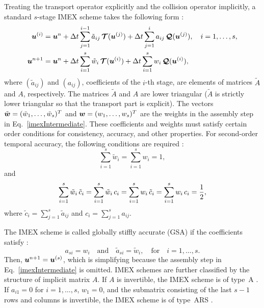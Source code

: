 Treating the transport operator explicitly and the collision operator implicitly, a standard $s$-stage IMEX scheme takes the following form \cite{pareschiRusso_2005}: 
\begin{align}
  \boldsymbol{u}^{(i)}
  &=\boldsymbol{u}^{n}
  +\Delta t\sum_{j=1}^{i-1}\tilde{a}_{ij}\,\boldsymbol{\mathcal{T}}(\boldsymbol{u}^{(j)})
  +\Delta t\sum_{j=1}^{i}a_{ij}\,\boldsymbol{\mathcal{Q}}(\boldsymbol{u}^{(j)}),
  \quad i=1,\ldots,s, \label{imexStages} \\
  \boldsymbol{u}^{n+1}
  &=\boldsymbol{u}^{n}
  +\Delta t\sum_{i=1}^{s}\tilde{w}_{i}\,\boldsymbol{\mathcal{T}}(\boldsymbol{u}^{(i)})
  +\Delta t\sum_{i=1}^{s}w_{i}\,\boldsymbol{\mathcal{Q}}(\boldsymbol{u}^{(i)}), \label{imexIntermediate} 
\end{align}
where $(\tilde{a}_{ij})$ and $(a_{ij})$, coefficients of the $i$-th stage, are elements of matrices $\tilde{A}$ and $A$, respectively.
The matrices $\tilde{A}$ and $A$ are lower triangular ($\tilde{A}$ is strictly lower triangular so that the transport part is explicit).  
The vectors $\tilde{\boldsymbol{w}}=(\tilde{w}_{1},\ldots,\tilde{w}_{s})^{T}$ and $\boldsymbol{w}=(w_{1},\ldots,w_{s})^{T}$ are the weights in the assembly step in Eq.~\eqref{imexIntermediate}.
These coefficients and weights must satisfy certain order conditions for consistency, accuracy, and other properties.  
For second-order temporal accuracy, the following conditions are required \cite{hairer_1981}:
\begin{equation}
  \sum_{i=1}^{s}\tilde{w}_{i}=\sum_{i=1}^{s}w_{i}=1,
  \label{orderConditions1}
\end{equation}
and
\begin{equation}
  \sum_{i=1}^{s}\tilde{w}_{i}\,\tilde{c}_{i}
  =\sum_{i=1}^{s}\tilde{w}_{i}\,c_{i}
  =\sum_{i=1}^{s}w_{i}\,\tilde{c}_{i}
  =\sum_{i=1}^{s}w_{i}\,c_{i}=\frac{1}{2}, 
  \label{orderConditions2}
\end{equation}
where $\tilde{c}_{i} = \sum_{j=1}^{s}\tilde{a}_{ij}$ and $c_{i}=\sum_{j=1}^{s}a_{ij}$.

The IMEX scheme is called globally stiffly accurate (GSA) if the coefficients satisfy \cite{dimarcoPareschi2013}:
\begin{equation}
  a_{si}=w_{i} \quad\text{and}\quad \tilde{a}_{si}=\tilde{w}_{i}, \quad \text{for} \quad i=1,\ldots,s.
\end{equation}
Then, $\boldsymbol{u}^{n+1} = \boldsymbol{u}^{(s)}$, which is simplifying because the assembly step in Eq.~\eqref{imexIntermediate} is omitted.  
IMEX schemes are further classified by the structure of implicit matrix $A$.  
If $A$ is invertible, the IMEX scheme is of type~A \cite{pareschiRusso_2005}.  
If $a_{i1} = 0$ for $i=1,\ldots,s$, $w_{1} = 0$, and the submatrix consisting of the last $s-1$ rows and columns is invertible, the IMEX scheme is of type~ARS \cite{ascher_etal_1997,pareschiRusso_2005}.  

